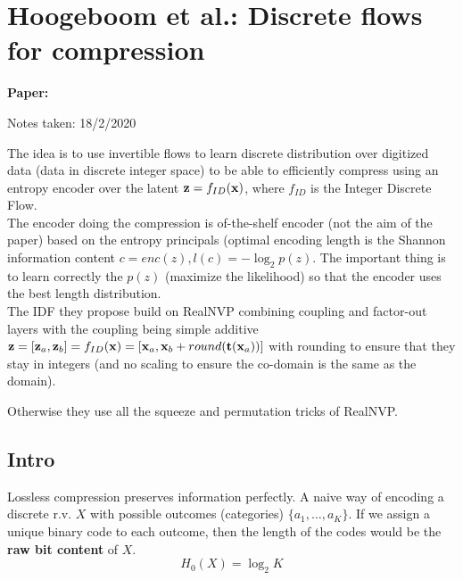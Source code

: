 \clearpage

\section{Hoogeboom et al.: Discrete flows for compression}

\begin{notebox}
\textbf{Paper: } 

\hfill Notes taken: 18/2/2020 
\end{notebox}

\begin{notebox}
\tldr The idea is to use invertible flows to learn discrete distribution over digitized data (data in discrete integer space) to be able to efficiently compress using an entropy encoder over the latent $\mathbf{z} = f_{ID}(\mathbf{x})$, where $f_{ID}$ is the Integer Discrete Flow. \\

The encoder doing the compression is of-the-shelf encoder (not the aim of the paper) based on the entropy principals (optimal encoding length is the Shannon information content $c = enc(z), l(c) = -\log_2 p(z)$. The important thing is to learn correctly the $p(z)$ (maximize the likelihood) so that the encoder uses the best length distribution. \\

The IDF they propose build on RealNVP combining coupling and factor-out layers with the coupling being simple additive $\mathbf{z} = [\mathbf{z}_a, \mathbf{z}_b] = f_{ID}(\mathbf{x}) = [\mathbf{x}_a, \mathbf{x}_{b} + round(\mathbf{t}(\mathbf{x}_a))]$ with rounding to ensure that they stay in integers (and no scaling to ensure the co-domain is the same as the domain).

Otherwise they use all the squeeze and permutation tricks of RealNVP.

\end{notebox}

\subsection{Intro}


Lossless compression preserves information perfectly.
A naive way of encoding a discrete r.v. $X$ with possible outcomes (categories) $\{a_1, \ldots, a_K\}$. If we assign a unique binary code to each outcome, then the length of the codes would be the \textbf{raw bit content} of $X$.
\begin{equation}
H_0(X) = \log_2 K
\end{equation}


